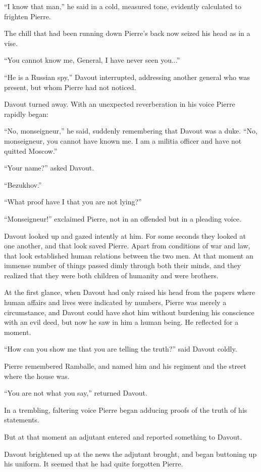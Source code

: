 ``I know that man,'' he said in a cold, measured tone, evidently
calculated to frighten Pierre.

The chill that had been running down Pierre's back now seized his
head as in a vise.

``You cannot know me, General, I have never seen you...''

``He is a Russian spy,'' Davout interrupted, addressing another
general who was present, but whom Pierre had not noticed.

Davout turned away. With an unexpected reverberation in his voice
Pierre rapidly began:

``No, monseigneur,'' he said, suddenly remembering that Davout
was a duke.  ``No, monseigneur, you cannot have known me. I am a
militia officer and have not quitted Moscow.''

``Your name?'' asked Davout.

``Bezukhov.''

``What proof have I that you are not lying?''

``Monseigneur!'' exclaimed Pierre, not in an offended but in a
pleading voice.

Davout looked up and gazed intently at him. For some seconds they
looked at one another, and that look saved Pierre. Apart from
conditions of war and law, that look established human relations
between the two men. At that moment an immense number of things
passed dimly through both their minds, and they realized that
they were both children of humanity and were brothers.

At the first glance, when Davout had only raised his head from
the papers where human affairs and lives were indicated by
numbers, Pierre was merely a circumstance, and Davout could have
shot him without burdening his conscience with an evil deed, but
now he saw in him a human being. He reflected for a moment.

``How can you show me that you are telling the truth?'' said
Davout coldly.

Pierre remembered Ramballe, and named him and his regiment and
the street where the house was.

``You are not what you say,'' returned Davout.

In a trembling, faltering voice Pierre began adducing proofs of
the truth of his statements.

But at that moment an adjutant entered and reported something to
Davout.

Davout brightened up at the news the adjutant brought, and began
buttoning up his uniform. It seemed that he had quite forgotten
Pierre.

